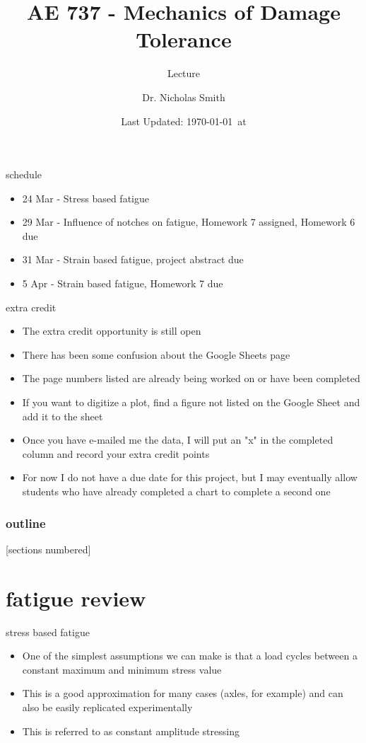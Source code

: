 \documentclass[10pt]{beamer}
\title{AE 737 - Mechanics of Damage Tolerance}
\subtitle{Lecture \arabic{lecture}}
\date{Last Updated: \today\ at \DTMcurrenttime}
\author{Dr. Nicholas Smith}
\institute{Wichita State University, Department of Aerospace Engineering}
\begin{document}
\maketitle
\begin{frame}{schedule}
	\begin{itemize}
		\item 24 Mar - Stress based fatigue
		\item 29 Mar - Influence of notches on fatigue, Homework 7 assigned, Homework 6 due
		\item 31 Mar - Strain based fatigue, project abstract due
		\item 5 Apr - Strain based fatigue, Homework 7 due
	\end{itemize}
\end{frame}

\begin{frame}{extra credit}
	\begin{itemize}[<+->]
		\item The extra credit opportunity is still open
		\item There has been some confusion about the Google Sheets page
		\item The page numbers listed are already being worked on or have been completed
		\item If you want to digitize a plot, find a figure not listed on the Google Sheet and add it to the sheet
		\item Once you have e-mailed me the data, I will put an "x" in the completed column and record your extra credit points
		\item For now I do not have a due date for this project, but I may eventually allow students who have already completed a chart to complete a second one
	\end{itemize}
\end{frame}

\begin{frame}
  \frametitle{outline}
  [sections numbered]
  \tableofcontents[hideallsubsections]
\end{frame}

\section{fatigue review}

\begin{frame}{stress based fatigue}
	\begin{itemize}[<+->]
		\item One of the simplest assumptions we can make is that a load cycles between a constant maximum and minimum stress value
		\item This is a good approximation for many cases (axles, for example) and can also be easily replicated experimentally
		\item This is referred to as constant amplitude stressing
	\end{itemize}
\end{frame}
\end{document}
